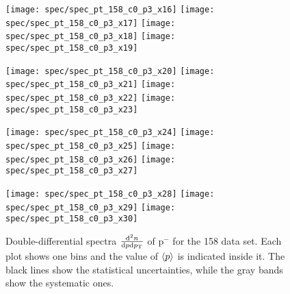 \begin{figure}[!ht]
  \centering

  \texttt{[image: spec/spec\_pt\_158\_c0\_p3\_x16]}
  \texttt{[image: spec/spec\_pt\_158\_c0\_p3\_x17]}
  \texttt{[image: spec/spec\_pt\_158\_c0\_p3\_x18]}
  \texttt{[image: spec/spec\_pt\_158\_c0\_p3\_x19]}

  \texttt{[image: spec/spec\_pt\_158\_c0\_p3\_x20]}
  \texttt{[image: spec/spec\_pt\_158\_c0\_p3\_x21]}
  \texttt{[image: spec/spec\_pt\_158\_c0\_p3\_x22]}
  \texttt{[image: spec/spec\_pt\_158\_c0\_p3\_x23]}

  \texttt{[image: spec/spec\_pt\_158\_c0\_p3\_x24]}
  \texttt{[image: spec/spec\_pt\_158\_c0\_p3\_x25]}
  \texttt{[image: spec/spec\_pt\_158\_c0\_p3\_x26]}
  \texttt{[image: spec/spec\_pt\_158\_c0\_p3\_x27]}

  \texttt{[image: spec/spec\_pt\_158\_c0\_p3\_x28]}
  \texttt{[image: spec/spec\_pt\_158\_c0\_p3\_x29]}
  \texttt{[image: spec/spec\_pt\_158\_c0\_p3\_x30]}

  \caption{Double-differential spectra $\frac{\text{d}^2n}{\text{d}p\text{d}p_\text{T}}$
    of p$^-$ for the 158 \GeVc data set. Each plot shows one \pp bins and the value
    of $\langle p\rangle$ is indicated inside it. The black lines show the statistical
    uncertainties, while the gray bands show the systematic ones.}
  \label{fig:hadron:spec:dedx:all158:c1p3}
\end{figure}


